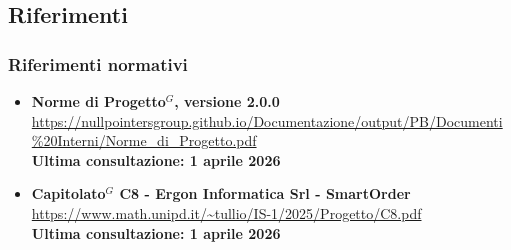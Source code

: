 	\subsection{Riferimenti}
	\subsubsection{Riferimenti normativi}

	\begin{itemize}[itemsep=5pt, parsep=5pt, label=$\scriptstyle\bullet$]

    \item \textbf{Norme di Progetto$^G$, versione 2.0.0}\\
    \url{https://nullpointersgroup.github.io/Documentazione/output/PB/Documenti%20Interni/Norme_di_Progetto.pdf}\\[3pt]
    \textbf{Ultima consultazione: 1 aprile 2026}

    \item \textbf{Capitolato$^G$ C8 - Ergon Informatica Srl - SmartOrder}\\
    \url{https://www.math.unipd.it/~tullio/IS-1/2025/Progetto/C8.pdf}\\[3pt]
    \textbf{Ultima consultazione: 1 aprile 2026}

	\end{itemize}

